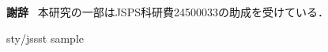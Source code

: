 \documentclass[T]{compsoft}
\begin{document}
%
\maketitle \thispagestyle {empty}








{\bf 謝辞}\
本研究の一部はJSPS科研費24500033の助成を受けている．

 {sty/jssst}
 {sample}


\end{document}
